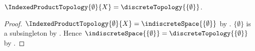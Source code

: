 \begin{theorem}\label{empty_indexed_product_is_discrete}
    $\IndexedProductTopology{\emptyset}{X}
        =\discreteTopology{\{\emptyset\}}$.
\end{theorem}
\begin{proof}
    $\IndexedProductTopology{\emptyset}{X}
        =\indiscreteSpace{\{\emptyset\}}$ by
        .
    $\{\emptyset\}$ is a subsingleton by
        .
    Hence $\indiscreteSpace{\{\emptyset\}}
        =\discreteTopology{\{\emptyset\}}$ by
        .
\end{proof}

